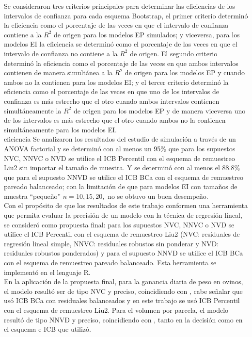 Se consideraron tres criterios principales para determinar las eficiencias de los intervalos de confianza para cada esquema Bootstrap, el primer criterio determinó la eficiencia como el porcentaje de las veces en que el intervalo de confianza contiene a la $R^2$ de origen para los modelos EP simulados; y viceversa, para los modelos EI la eficiencia se determinó como el porcentaje de las veces en que el intervalo de confianza no contiene a la $R^2$ de origen. El segundo criterio determinó la eficiencia como el porcentaje de las veces en que ambos intervalos contienen de manera simultánea a la $R^2$ de origen para los modelos EP y cuando ambos no la contienen para los modelos EI; y el tercer criterio determinó la eficiencia como el porcentaje de las veces en que uno de los intervalos de confianza es más estrecho que el otro cuando ambos intervalos contienen simultáneamente la $R^2$ de origen para los modelos EP y de manera viceversa uno de los intervalos es más estrecho que el otro cuando ambos no la contienen simultáneamente para los modelos EI.\\
eficiencia
Se analizaron los resultados del estudio de simulación a través de un ANOVA factorial y se determinó con al menos un 95\% que para los supuestos NVC, NNVC o NVD se utilice el ICB Percentil con el esquema de remuestreo Liu2 sin importar el tamaño de muestra. Y se determinó con al menos el 88.8\% que para el supuesto NNVD se utilice el ICB BCa con el esquema de remuestreo pareado balanceado; con la limitación de que para modelos EI con tamaños de muestra “pequeño” $n=10, 15, 20,$ no se obtuvo un buen desempeño.\\


Con el propósito de que los resultados de este trabajo conformen una herramienta que permita evaluar la precisión de un modelo con la técnica de regresión lineal, se consideró como propuesta final: para los supuestos NVC, NNVC o NVD se utilice el ICB Percentil con el esquema de remuestreo Liu2 (NVC: residuales de regresión lineal simple, NNVC: residuales robustos sin ponderar y NVD: residuales robustos ponderados) y para el supuesto NNVD se utilice el ICB BCa con el esquema de remuestreo pareado balanceado. Esta herramienta se implementó en el lenguaje R.\\

En la aplicación de la propuesta final, para la ganancia diaria de peso en ovinos, el modelo resultó ser de tipo NVC y preciso, coincidiendo con \textcite{balam-2012}, cabe señalar que usó ICB BCa con residuales balanceados y en este trabajo se usó ICB Percentil con el esquema de remuestreo Liu2. Para el volumen por parcela, el modelo resultó de tipo NNVD y preciso, coincidiendo con \textcite{balam-2012}, tanto en la decisión como en el esquema e ICB que utilizó.\\



